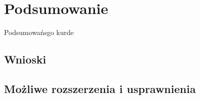 \chapter{Podsumowanie}
\label{cha:podsumowanie}

Podsumowańsgo kurde


\section{Wnioski}

\section{Możliwe rozszerzenia i usprawnienia}